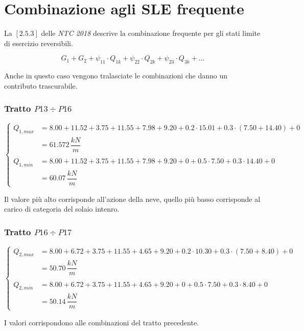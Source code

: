 \section{Combinazione agli SLE frequente}
La $[2.5.3]$ delle \emph{NTC 2018} descrive la combinazione frequente per gli stati limite di esercizio reversibili.

\[
	G_1 + G_2 + \psi_{11}\cdot Q_{1k} + \psi_{22}\cdot Q_{2k} + \psi_{23}\cdot Q_{3k} + \dots
\]

Anche in questo caso vengono tralasciate le combinazioni che danno un contributo trascurabile.

\subsubsection*{Tratto $P13\div P16$}
\begin{equation*}
	\begin{cases}
		Q_{1,max} &= 8.00+11.52+3.75 + 11.55+7.98+9.20 + 0.2\cdot15.01 + 0.3\cdot(7.50+14.40) +0\\
		&= 61.572\,\dfrac{kN}{m}\\\\
		Q_{1,min} &= 8.00+11.52+3.75 + 11.55+7.98+9.20+0 + 0.5\cdot 7.50 + 0.3\cdot 14.40 +0\\
		&= 60.07\,\dfrac{kN}{m}
	\end{cases}
\end{equation*}

Il valore più alto corrisponde all'azione della neve, quello più basso corrisponde al carico di categoria del solaio intenro.

\subsubsection*{Tratto $P16\div P17$}
\begin{equation*}
	\begin{cases}
		Q_{2,max} &= 8.00+6.72+3.75 + 11.55+4.65+9.20 + 0.2\cdot10.30 + 0.3\cdot(7.50+8.40) + 0\\
		&= 50.70\,\dfrac{kN}{m}\\\\
		Q_{2,min} &= 8.00+6.72+3.75 + 11.55+4.65+9.20 +0+0.5\cdot 7.50 + 0.3\cdot 8.40+0\\
		&= 50.14\,\dfrac{kN}{m}
	\end{cases}
\end{equation*}

I valori corrispondono alle combinazioni del tratto precedente.


